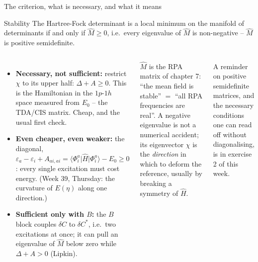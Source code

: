 \documentclass[aspectratio=169,10pt]{beamer}
\newcommand{\mbbox}[1]{%
  \begin{tcolorbox}[colback=paleblue,colframe=uioblue,title={\bfseries Many-body connection}]
  #1
  \end{tcolorbox}}
\newcommand{\element}[3]{\langle #1\vert #2\vert #3\rangle}
\begin{document}
\begin{frame}{The criterion, what is necessary, and what it means}
  \footnotesize
  \begin{block}{Stability}
    The Hartree-Fock determinant is a local minimum on the manifold of determinants \alert{if and only if} $\hat M\ge0$, i.e.\ every eigenvalue of $\hat M$ is non-negative -- $\hat M$ is positive semidefinite.
  \end{block}
  \begin{columns}[T]
    \begin{itemize}
      \item \textbf{Necessary, not sufficient:} restrict $\chi$ to its upper half: $\Delta+A\ge0$. This is the Hamiltonian in the $1p$-$1h$ space measured from $E_0$ -- the TDA/CIS matrix. Cheap, and the usual first check.
      \item \textbf{Even cheaper, even weaker:} the diagonal, $\varepsilon_a-\varepsilon_i+A_{ai,ai}=\element{\Phi_i^a}{\hat H}{\Phi_i^a}-E_0\ge0$: every single excitation must cost energy. (Week 39, Thursday: the curvature of $E(\eta)$ along one direction.)
      \item \textbf{Sufficient only with $B$:} the $B$ block couples $\delta C$ to $\delta C^{*}$, i.e.\ two excitations at once; it can pull an eigenvalue of $\hat M$ below zero while $\Delta+A>0$ (Lipkin).
    \end{itemize}
    \mbbox{$\hat M$ is the RPA matrix of chapter 7: ``the mean field is stable'' $=$ ``all RPA frequencies are real''. A negative eigenvalue is not a numerical accident; its eigenvector $\chi$ is the \emph{direction} in which to deform the reference, usually by breaking a symmetry of $\hat H$.}
    \vspace{0.3em}
    \scriptsize A reminder on positive semidefinite matrices, and the necessary conditions one can read off without diagonalising, is in exercise 2 of this week.
  \end{columns}
\end{frame}
\end{document}
